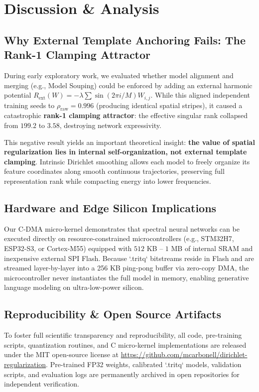 \documentclass[11pt,a4paper]{article}
\begin{document}
\section{Discussion \& Analysis}
\label{sec:discussion}

\subsection{Why External Template Anchoring Fails: The Rank-1 Clamping Attractor}
During early exploratory work, we evaluated whether model alignment and merging (e.g., Model Souping) could be enforced by adding an external harmonic potential $R_{\text{ext}}(W) = -\lambda \sum \sin(2\pi i / M) W_{i, j}$. While this aligned independent training seeds to $\rho_{\text{raw}} = 0.996$ (producing identical spatial stripes), it caused a catastrophic \textbf{rank-1 clamping attractor}: the effective singular rank collapsed from $199.2$ to $3.58$, destroying network expressivity.

This negative result yields an important theoretical insight: \textbf{the value of spatial regularization lies in internal self-organization, not external template clamping}. Intrinsic Dirichlet smoothing allows each model to freely organize its feature coordinates along smooth continuous trajectories, preserving full representation rank while compacting energy into lower frequencies.

\subsection{Hardware and Edge Silicon Implications}
Our C-DMA micro-kernel demonstrates that spectral neural networks can be executed directly on resource-constrained microcontrollers (e.g., STM32H7, ESP32-S3, or Cortex-M55) equipped with $512$ KB -- $1$ MB of internal SRAM and inexpensive external SPI Flash. Because `.tritq` bitstreams reside in Flash and are streamed layer-by-layer into a 256 KB ping-pong buffer via zero-copy DMA, the microcontroller never instantiates the full model in memory, enabling generative language modeling on ultra-low-power silicon.

\subsection{Reproducibility \& Open Source Artifacts}
To foster full scientific transparency and reproducibility, all code, pre-training scripts, quantization routines, and C micro-kernel implementations are released under the MIT open-source license at \url{https://github.com/mcarbonell/dirichlet-regularization}. Pre-trained FP32 weights, calibrated `.tritq` models, validation scripts, and evaluation logs are permanently archived in open repositories for independent verification.
\end{document}
